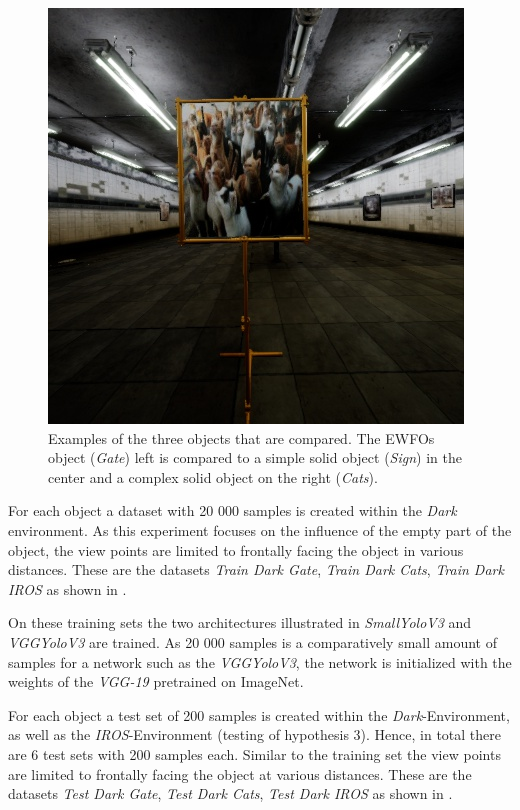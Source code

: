 \begin{figure}[hbtp]
\begin{minipage}{0.3\textwidth}
	\end{minipage}
	\begin{minipage}{0.3\textwidth}
		\includegraphics[width=\textwidth]{fig/cats}
	\end{minipage}
	\caption{Examples of the three objects that are compared. The \acp{EWFO} object (\textit{Gate}) left is compared to a simple solid object (\textit{Sign}) in the center and a complex solid object on the right (\textit{Cats}).}
	\label{fig:cats}
\end{figure}

For each object a dataset with 20 000 samples is created within the \textit{Dark} environment. As this experiment focuses on the influence of the empty part of the object, the view points are limited to frontally facing the object in various distances. These are the datasets \textit{Train Dark Gate}, \textit{Train Dark Cats}, \textit{Train Dark IROS} as shown in .

On these training sets the two architectures illustrated in  \textit{SmallYoloV3} and \textit{VGGYoloV3} are trained. As 20 000 samples is a comparatively small amount of samples for a network such as the \textit{VGGYoloV3}, the network is initialized with the weights of the \textit{VGG-19} pretrained on ImageNet.

For each object a test set of 200 samples is created within the \textit{Dark}-Environment, as well as the \textit{IROS}-Environment (testing of hypothesis 3). Hence, in total there are 6 test sets with 200 samples each. Similar to the training set the view points are limited to frontally facing the object at various distances. These are the datasets \textit{Test Dark Gate}, \textit{Test Dark Cats}, \textit{Test Dark IROS} as shown in .

